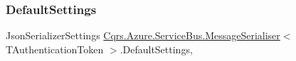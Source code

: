 \subsubsection{\texorpdfstring{Default\+Settings}{DefaultSettings}}
{\footnotesize\ttfamily Json\+Serializer\+Settings \hyperlink{classCqrs_1_1Azure_1_1ServiceBus_1_1MessageSerialiser}{Cqrs.\+Azure.\+Service\+Bus.\+Message\+Serialiser}$<$ T\+Authentication\+Token $>$.Default\+Settings\hspace{0.3cm}{\ttfamily [static]}, {\ttfamily [get]}}


